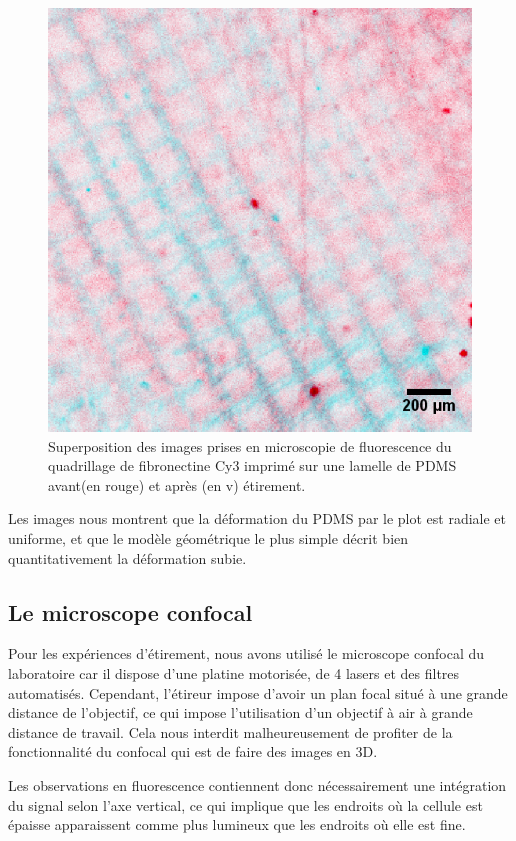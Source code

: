 \begin{figure}
\includegraphics[scale=0.3]{Figures/Zoom_Calibration_etireur_impress.png} 

\caption{Superposition des images prises en microscopie de fluorescence du quadrillage de fibronectine Cy3 imprimé sur une lamelle de PDMS avant(en rouge) et après (en v) étirement. }
\end{figure}
	Les images nous montrent que la déformation du PDMS par le plot est radiale et uniforme, et que le modèle géométrique le plus simple décrit bien quantitativement la déformation subie. 
	
	\subsection{Le microscope confocal}
	
	Pour les expériences d'étirement, nous avons utilisé le microscope confocal du laboratoire car il dispose d'une platine motorisée, de 4 lasers et des filtres automatisés. Cependant, l'étireur impose d'avoir un plan focal situé à une grande distance de l'objectif, ce qui impose l'utilisation d'un objectif à air à grande distance de travail. Cela nous interdit malheureusement de profiter de la fonctionnalité du confocal qui est de faire des images en 3D. 
	
	Les observations en fluorescence contiennent donc nécessairement une intégration du signal selon l'axe vertical, ce qui implique que les endroits où la cellule est épaisse apparaissent comme plus lumineux que les endroits où elle est fine. 
	

